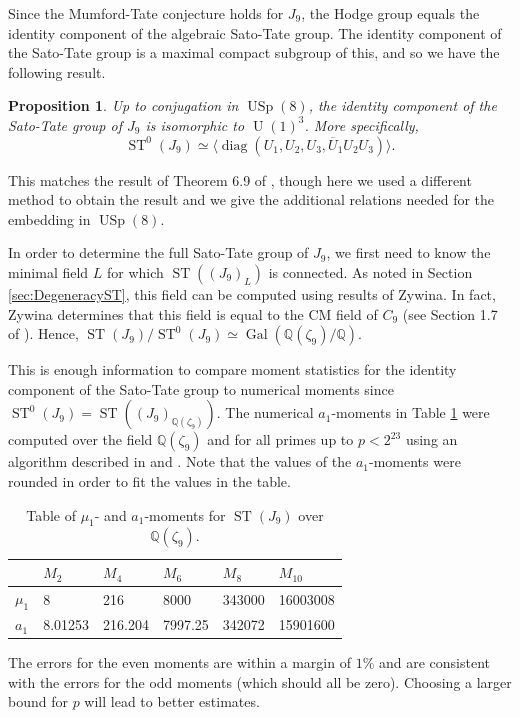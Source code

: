 \documentclass[reqno, oneside, 12pt]{amsart}
\DeclareMathOperator{\USp}{USp}
\DeclareMathOperator{\U}{U}
\DeclareMathOperator{\ST}{ST}
\DeclareMathOperator{\Gal}{Gal}
\DeclareMathOperator{\diag}{diag}
\newcommand{\Q}{\mathbb{Q}}
\newtheorem{proposition}[theorem]{Proposition}
\theoremstyle{remark}
\numberwithin{equation}{section}
\begin{document}
Since the Mumford-Tate conjecture holds for $J_9$, the Hodge group equals the identity component of the algebraic Sato-Tate group. The identity component of the Sato-Tate group is a maximal compact subgroup of this, and so we have the following result. 

\begin{proposition}\label{prop:STidentity9}
Up to conjugation in $\USp(8)$, the identity component of the Sato-Tate group of $J_9$  is isomorphic to $\U(1)^3$. More specifically, 
$$\ST^0(J_9)\simeq\langle\diag(U_1,U_2,U_3,\overline U_1U_2U_3)\rangle.$$
\end{proposition}
This matches the result of Theorem 6.9 of \cite{EmoryGoodsonPeyrot}, though here we used a different method to obtain the result and we give the additional relations needed for the embedding in $\USp(8)$.




In order to determine the full Sato-Tate group of $J_9$, we first need to know the minimal field $L$ for which $\ST((J_9)_L)$ is connected. As noted in Section \ref{sec:DegeneracyST}, this field can be computed using results of Zywina. In fact, Zywina determines that this field is equal to the CM field of $C_9$ (see Section 1.7 of \cite{zywina2020determining}). Hence, $\ST(J_9)/\ST^0(J_9) \simeq \Gal(\Q(\zeta_9)/\Q).$


This is enough information to compare moment statistics for the identity component of the Sato-Tate group to  numerical moments since $\ST^0(J_9)=\ST((J_9)_{\Q(\zeta_9)})$. The numerical $a_1$-moments in Table \ref{table:momemntsJ9zeta9} were computed over the  field $\Q(\zeta_9)$ and for all primes up to $p<2^{23}$ using an algorithm described in \cite{HarveySuth2014} and \cite{HarveySuth2016}. Note that the values of the $a_1$-moments were rounded in order to fit the values in the table.

\begin{table}[h]
\begin{tabular}{|l|l|l|l|l|l|}
\hline
&$M_2$ & $M_4$ & $M_6$ & $M_8$& $M_{10}$\\ 
\hline
$\mu_1$ & 8&216&8000 & 343000& 16003008 \\
$a_1$  &  8.01253&216.204&7997.25&342072& 15901600\\
\hline
\end{tabular}
\caption{Table of $\mu_1$- and $a_1$-moments for $\ST(J_9)$ over $\mathbb Q(\zeta_9)$.}\label{table:momemntsJ9zeta9}\vspace{-.2in}
\end{table}
The errors for the even moments are within a margin of $1\%$ and are consistent with the errors for the odd moments (which should all be zero). Choosing a larger bound for $p$ will lead to better estimates.
\end{document}
